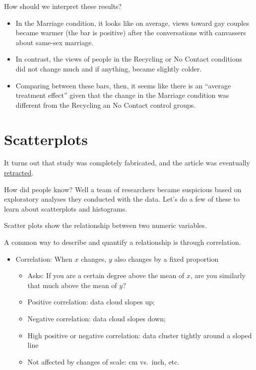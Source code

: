 \documentclass[
  letterpaper,
  DIV=11,
  numbers=noendperiod]{scrreprt}
\providecommand{\tightlist}{%
  \setlength{\itemsep}{0pt}\setlength{\parskip}{0pt}}\usepackage{longtable,booktabs,array}
\begin{document}
How should we interpret these results?

\begin{itemize}
\tightlist
\item
  In the Marriage condition, it looks like on average, views toward gay
  couples became warmer (the bar is positive) after the conversations
  with canvassers about same-sex marriage.
\item
  In contrast, the views of people in the Recycling or No Contact
  conditions did not change much and if anything, became slightly
  colder.
\item
  Comparing between these bars, then, it seems like there is an
  ``average treatment effect'' given that the change in the Marriage
  condition was different from the Recycling an No Contact control
  groups.
\end{itemize}

\hypertarget{scatterplots}{%
\section{Scatterplots}\label{scatterplots}}

It turns out that study was completely fabricated, and the article was
eventually
\href{https://www.newyorker.com/science/maria-konnikova/how-a-gay-marriage-study-went-wrong}{retracted}.

How did people know? Well a team of researchers became suspicious based
on exploratory analyses they conducted with the data. Let's do a few of
these to learn about scatterplots and histograms.

Scatter plots show the relationship between two numeric variables.

A common way to describe and quantify a relationship is through
correlation.

\begin{itemize}
\tightlist
\item
  Correlation: When \(x\) changes, \(y\) also changes by a fixed
  proportion

  \begin{itemize}
  \tightlist
  \item
    Asks: If you are a certain degree above the mean of \(x\), are you
    similarly that much above the mean of \(y\)?
  \item
    Positive correlation: data cloud slopes up;
  \item
    Negative correlation: data cloud slopes down;
  \item
    High positive or negative correlation: data cluster tightly around a
    sloped line
  \item
    Not affected by changes of scale: cm vs.~inch, etc.
  \end{itemize}
\end{itemize}
\end{document}
